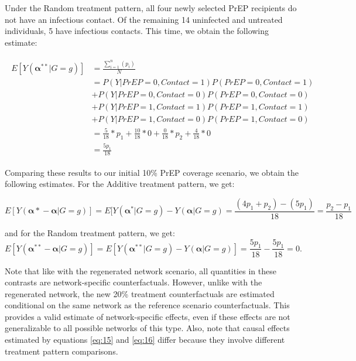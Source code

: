 \documentclass{article}
\theoremstyle{definition}
\begin{document}
Under the Random treatment pattern, all four newly selected PrEP recipients do not have an infectious contact. Of the remaining 14 uninfected and untreated individuals, 5 have infectious contacts. This time, we obtain the following estimate: 

\begin{align}\label{eq:14}
\begin{split}
E[Y\left(\mathbf{\alpha^{**}}|G=g\right)] & = \frac{\sum_{i=1}^{n}(p_{i})}{N}  \\ 
& = P\left(Y|PrEP = 0, Contact = 1\right)P\left(PrEP = 0, Contact = 1\right)  \\ \nonumber
& +P\left(Y|PrEP = 0, Contact = 0\right)P\left(PrEP = 0, Contact = 0\right)  \\ \nonumber
& +P\left(Y|PrEP = 1, Contact = 1\right)P\left(PrEP = 1, Contact = 1\right) \\ \nonumber
&  +P\left(Y|PrEP = 1, Contact = 0\right)P\left(PrEP = 1, Contact = 0\right) \\ \nonumber
 &= \frac{5}{18}*p_1 +  \frac{10}{18}*0+\frac{0}{18}*p_2 +  \frac{4}{18}*0  \\ \nonumber
 &=\frac{5p_1}{18}  \nonumber
 \end{split}
\end{align}

Comparing these results to our initial 10\% PrEP coverage scenario, we obtain the following estimates. For the Additive treatment pattern, we get:

\begin{equation}\label{eq:15}
E\left[Y\left(\mathbf{\alpha*}-\mathbf{\alpha}|G=g\right)\right] =  E[Y\left(\mathbf{\alpha^*}|G=g\right) -Y\left(\mathbf{\alpha}|G=g\right) = 
\frac{\left(4p_1+p_2\right)-\left(5p_1\right)}{18}=
\frac{p_2-p_1}{18}
\end{equation}

and for the Random treatment pattern, we get:
\begin{equation}\label{eq:16}
E\left[Y\left(\mathbf{\alpha^{**}}-\mathbf{\alpha}|G=g\right)\right] =E[Y\left(\mathbf{\alpha^{**}}|G=g\right) -Y\left(\mathbf{\alpha}|G=g\right)] = \frac{5p_1}{18} - \frac{5p_1}{18} =0.
\end{equation}

Note that like with the regenerated network scenario, all quantities in these contrasts are network-specific counterfactuals. However, unlike with the regenerated network, the new 20\% treatment counterfactuals are estimated conditional on the same network as the reference scenario counterfactuals. This provides a valid estimate of network-specific effects, even if these effects are not generalizable to all possible networks of this type. Also, note that causal effects estimated by equations \ref{eq:15} and \ref{eq:16} differ because they involve different treatment pattern comparisons.
\end{document}
